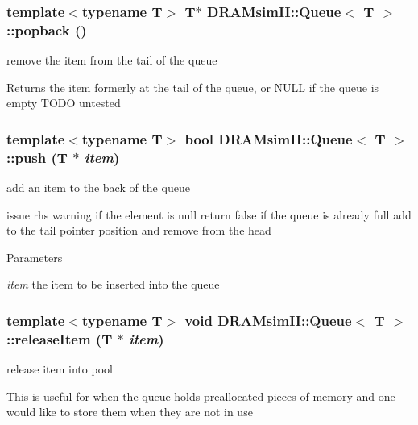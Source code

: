 \subsubsection[{popback}]{\setlength{\rightskip}{0pt plus 5cm}template$<$typename T$>$ T$\ast$ {\bf DRAMsimII::Queue}$<$ T $>$::popback ()\hspace{0.3cm}{\ttfamily  [inline]}}\label{class_d_r_a_msim_i_i_1_1_queue_a33d70a6d9462359c8539401ad45b4c3f}


remove the item from the tail of the queue 

\begin{DoxyReturn}{Returns}
the item formerly at the tail of the queue, or NULL if the queue is empty TODO untested 
\end{DoxyReturn}
\subsubsection[{push}]{\setlength{\rightskip}{0pt plus 5cm}template$<$typename T$>$ bool {\bf DRAMsimII::Queue}$<$ T $>$::push (T $\ast$ {\em item})\hspace{0.3cm}{\ttfamily  [inline]}}\label{class_d_r_a_msim_i_i_1_1_queue_a617e50de4a77b5bc1e7ec3368bb132ac}


add an item to the back of the queue 

issue rhs warning if the element is null return false if the queue is already full add to the tail pointer position and remove from the head 
\begin{DoxyParams}{Parameters}
\item[{\em item}]the item to be inserted into the queue \end{DoxyParams}
\subsubsection[{releaseItem}]{\setlength{\rightskip}{0pt plus 5cm}template$<$typename T$>$ void {\bf DRAMsimII::Queue}$<$ T $>$::releaseItem (T $\ast$ {\em item})\hspace{0.3cm}{\ttfamily  [inline]}}\label{class_d_r_a_msim_i_i_1_1_queue_ab9035bfc5f1a6db6ab697a5058642f38}


release item into pool 

This is useful for when the queue holds preallocated pieces of memory and one would like to store them when they are not in use 
